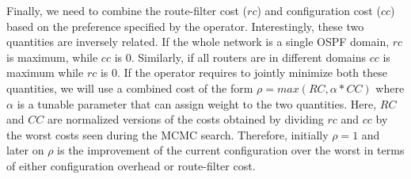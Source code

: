 Finally, we need to combine the
route-filter cost ($rc$) and configuration cost ($cc$) 
based on the preference specified by the operator. 
Interestingly, these two quantities are inversely related. 
If the whole network is a single OSPF domain, $rc$ is maximum, while
$cc$ is 0. Similarly, if all routers are in different domains
$cc$ is maximum while $rc$ is 0. 
If the operator requires to
 jointly minimize both these quantities, we
will use a combined cost of the form $\rho=max(RC, \alpha*CC)$ where $\alpha$ is a tunable parameter
that can assign weight to the two quantities. Here,
$RC$ and $CC$ are normalized versions of the costs
obtained by dividing $rc$ and $cc$  by the worst costs seen during the MCMC search.
Therefore, initially $\rho=1$ and later on $\rho$ is the improvement of the current configuration over
the worst in terms of either configuration overhead or route-filter cost.

